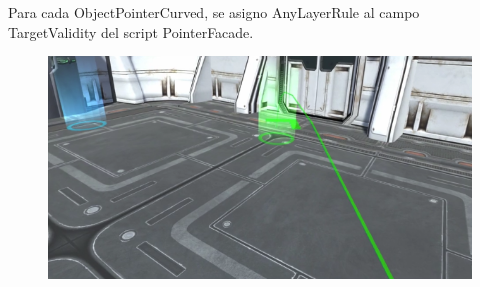 Para cada ObjectPointerCurved, se asigno AnyLayerRule al campo TargetValidity del script PointerFacade.\\
\begin{figure}[H]
	\begin{center}
 		\includegraphics[width = .5\textwidth]{source/images/image45.png}
	\end{center} 
\end{figure}

